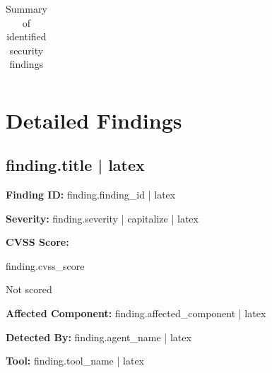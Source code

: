 \documentclass[11pt,a4paper]{article}
\begin{document}
{{{\begin{table}[h]
\begin{tabular}{lc}
        \bottomrule

    \end{tabular}

    \caption{Summary of identified security findings}

\end{table}



\newpage

\section{Detailed Findings}


{%


{%


\subsection{ {{ finding.title | latex }} }

\begin{itemize}[leftmargin=*]

    \item \textbf{Finding ID:}
    {{ finding.finding_id | latex }}

    \item \textbf{Severity:}
    {{ finding.severity | capitalize | latex }}

    \item \textbf{CVSS Score:}

    {%

    {{ finding.cvss_score }}

    {%

    Not scored

    {%

    \item \textbf{Affected Component:}
    {{ finding.affected_component | latex }}

    \item \textbf{Detected By:}
    {{ finding.agent_name | latex }}


    {%

    \item \textbf{Tool:}
    {{ finding.tool_name | latex }}

}}}}
\end{itemize}}}}}}
\end{document}
